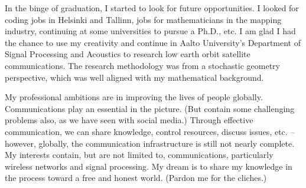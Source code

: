 \documentclass{article}
\begin{document}
{          In the binge of graduation, I started to look for future opportunities. I looked for coding jobs in Helsinki and Tallinn, jobs for mathematicians in the mapping industry, continuing at some universities to pursue a Ph.D., etc. I am glad I had the chance to use my creativity and continue in Aalto University's Department of Signal Processing and Acoustics to research low earth orbit satellite communications. The research methodology was from a stochastic geometry perspective, which was well aligned with my mathematical background.

          My professional ambitions are in improving the lives of people globally. Communications play an essential in the picture. (But contain some challenging problems also, as we have seen with social media.) Through effective communication, we can share knowledge, control resources, discuss issues, etc. -- however, globally, the communication infrastructure is still not nearly complete. My interests contain, but are not limited to, communications, particularly wireless networks and signal processing. My dream is to share my knowledge in the process toward a free and honest world. (Pardon me for the cliches.)
          
        }

\end{document}

